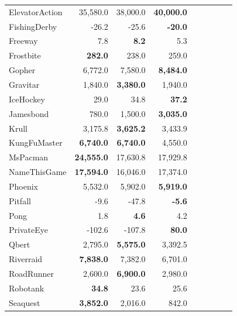 \begin{table}
{\begin{tabular}{lrrrrrrrl}
ElevatorAction & 35,580.0             & 38,000.0             & \textbf{40,000.0}    \\
FishingDerby   & -26.2                & -25.6                & \textbf{-20.0}       \\
Freeway        & 7.8                  & \textbf{8.2}         & 5.3                  \\
Frostbite      & \textbf{282.0}       & 238.0                & 259.0                \\
Gopher         & 6,772.0              & 7,580.0              & \textbf{8,484.0}     \\
Gravitar       & 1,840.0              & \textbf{3,380.0}     & 1,940.0              \\
IceHockey      & 29.0                 & 34.8                 & \textbf{37.2}        \\
Jamesbond      & 780.0                & 1,500.0              & \textbf{3,035.0}     \\
Krull          & 3,175.8              & \textbf{3,625.2}     & 3,433.9              \\
KungFuMaster   & \textbf{6,740.0}     & \textbf{6,740.0}     & 4,550.0              \\
MsPacman       & \textbf{24,555.0}    & 17,630.8             & 17,929.8             \\
NameThisGame   & \textbf{17,594.0}    & 16,046.0             & 17,374.0             \\
Phoenix        & 5,532.0              & 5,902.0              & \textbf{5,919.0}     \\
Pitfall        & -9.6                 & -47.8                & \textbf{-5.6}        \\
Pong           & 1.8                  & \textbf{4.6}         & 4.2                  \\
PrivateEye     & -102.6               & -107.8               & \textbf{80.0}        \\
Qbert          & 2,795.0              & \textbf{5,575.0}     & 3,392.5              \\
Riverraid      & \textbf{7,838.0}     & 7,382.0              & 6,701.0              \\
RoadRunner     & 2,600.0              & \textbf{6,900.0}     & 2,980.0              \\
Robotank       & \textbf{34.8}        & 23.6                 & 25.6                 \\
Seaquest       & \textbf{3,852.0}     & 2,016.0              & 842.0                \\

\end{tabular}}
\end{table}
